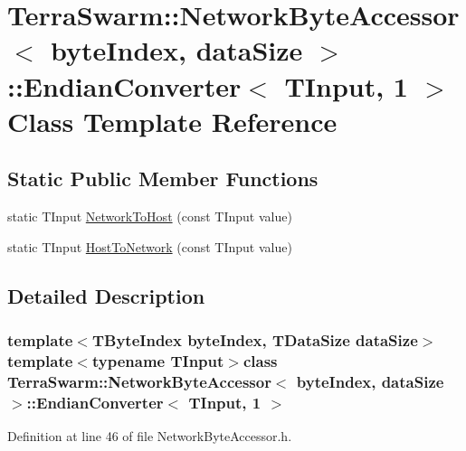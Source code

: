 \hypertarget{class_terra_swarm_1_1_network_byte_accessor_1_1_endian_converter_3_01_t_input_00_011_01_4}{\section{Terra\-Swarm\-:\-:Network\-Byte\-Accessor$<$ byte\-Index, data\-Size $>$\-:\-:Endian\-Converter$<$ T\-Input, 1 $>$ Class Template Reference}
\label{class_terra_swarm_1_1_network_byte_accessor_1_1_endian_converter_3_01_t_input_00_011_01_4}
}
\subsection*{Static Public Member Functions}
\begin{DoxyCompactItemize}
\item 
static T\-Input \hyperlink{class_terra_swarm_1_1_network_byte_accessor_1_1_endian_converter_3_01_t_input_00_011_01_4_ab318817475a64d968cff2871348393fc}{Network\-To\-Host} (const T\-Input value)
\item 
static T\-Input \hyperlink{class_terra_swarm_1_1_network_byte_accessor_1_1_endian_converter_3_01_t_input_00_011_01_4_a92c0e911b07728a12687573586cf040c}{Host\-To\-Network} (const T\-Input value)
\end{DoxyCompactItemize}


\subsection{Detailed Description}
\subsubsection*{template$<$T\-Byte\-Index byte\-Index, T\-Data\-Size data\-Size$>$template$<$typename T\-Input$>$class Terra\-Swarm\-::\-Network\-Byte\-Accessor$<$ byte\-Index, data\-Size $>$\-::\-Endian\-Converter$<$ T\-Input, 1 $>$}



Definition at line 46 of file Network\-Byte\-Accessor.\-h.




